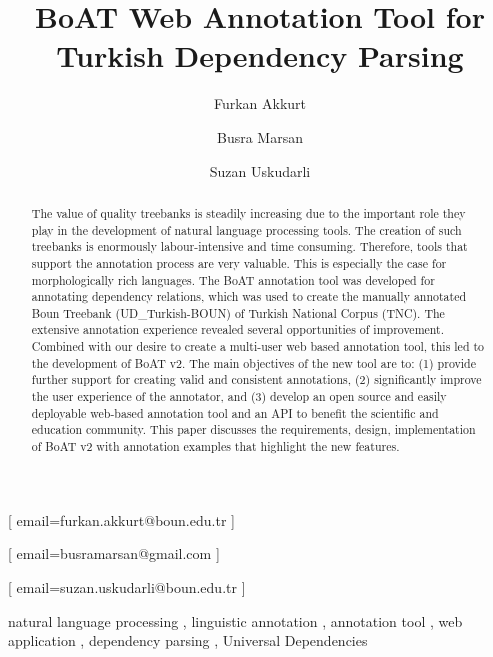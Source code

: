 \documentclass[
]{ceurart}
\begin{document}


\title{BoAT Web Annotation Tool for Turkish Dependency Parsing}

\author[]{Furkan Akkurt}[%
email=furkan.akkurt@boun.edu.tr
]

\author[]{Busra Marsan}[%
email=busramarsan@gmail.com
]

\author[]{Suzan Uskudarli}[%
email=suzan.uskudarli@boun.edu.tr
]

\address[]{ Department of Computer Engineering, Bogazici University, Bebek, 34342, İstanbul, Turkey }

\begin{abstract}
The value of quality treebanks is steadily increasing due to the important role they play in the development of natural language processing tools.
The creation of such treebanks is enormously labour-intensive and time consuming. 
Therefore, tools that support the annotation process are very valuable. 
This is especially the case for morphologically rich languages. 
The BoAT annotation tool was developed for annotating dependency relations, which was used to create the manually annotated Boun Treebank (UD_Turkish-BOUN) of Turkish National Corpus (TNC). 
The extensive annotation experience revealed several opportunities of improvement.
Combined with our desire to create a multi-user web based annotation tool, this led to the development of BoAT v2. 
The main objectives of the new tool are to: (1) provide further support for creating valid and consistent annotations, (2) significantly improve the user experience of the annotator, and (3) develop an open source and easily deployable web-based annotation tool and an API to benefit the scientific and education community. 
This paper discusses the requirements, design, implementation of BoAT v2 with annotation examples that highlight the new features. 
\end{abstract}

\begin{keywords}
natural language processing \sep
linguistic annotation \sep
annotation tool \sep
web application \sep
dependency parsing \sep
Universal Dependencies
\end{keywords}
\end{document}
